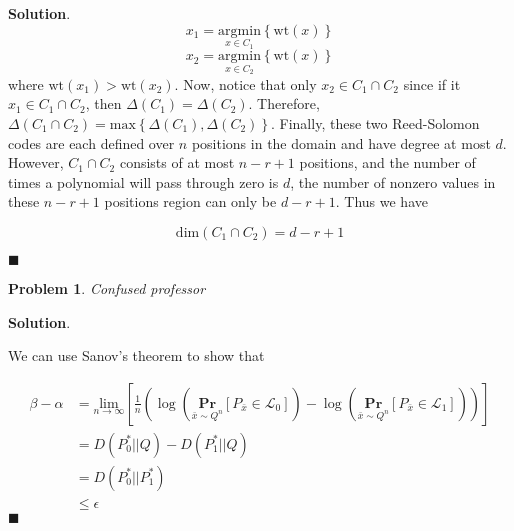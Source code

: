 \documentclass[12pt]{article}
\newtheorem{p}{Problem}[section]
\theoremstyle{definition}
\newenvironment{s}{%
        \begin{trivlist} \item \textbf{Solution}. }{%
            \hspace*{\fill} $\blacksquare$\end{trivlist}}%
\begin{document}
{\begin{s}
\begin{equation*}
x_{1} = \underset{x\in C_{1}}{\text{argmin}}\left\{\text{wt}(x)\right\}
\end{equation*}
\begin{equation*}
x_{2} = \underset{x\in C_{2}}{\text{argmin}}\left\{\text{wt}(x)\right\}
\end{equation*}
where $\text{wt}(x_{1}) > \text{wt}(x_{2})$. Now, notice that only $x_{2} \in C_{1}\cap C_{2}$ since if it $x_{1}\in C_{1}\cap C_{2}$, then $\Delta(C_{1}) = \Delta(C_{2})$. Therefore, $\Delta(C_{1}\cap C_{2}) = \text{max}\left\{\Delta(C_{1}),\Delta(C_{2})\right\}$. 
Finally, these two Reed-Solomon codes are each defined over $n$ positions in the domain and have degree at most $d$. However, $C_{1} \cap C_{2}$ consists of at most $n - r + 1$ positions, and the number of times a polynomial will pass through zero is $d$, the number of nonzero values in these $n-r+1$ positions region can only be $d - r + 1$. Thus we have 

\begin{equation*}
\text{dim}(C_{1}\cap C_{2}) = d - r + 1
\end{equation*}

\end{s}

\begin{p}
Confused professor
\end{p}

\begin{s}

We can use Sanov's theorem to show that 

\begin{align*}
\beta - \alpha &= \underset{n\rightarrow\infty}{\text{lim}}\left[\frac{1}{n}\left(\log\left(\underset{\bar{x}\sim Q^{n}}{\mathbf{Pr}}[P_{\bar{x}} \in \mathcal{L}_{0}]\right) - \log\left(\underset{\bar{x}\sim Q^{n}}{\mathbf{Pr}}[P_{\bar{x}} \in \mathcal{L}_{1}]\right)\right)\right]\\
&= D(P_{0}^{*}||Q) - D(P_{1}^{*}||Q) \\
&= D(P_{0}^{*}||P_{1}^{*})\\
&\leq \epsilon
\end{align*}
\end{s}
\end{document}
